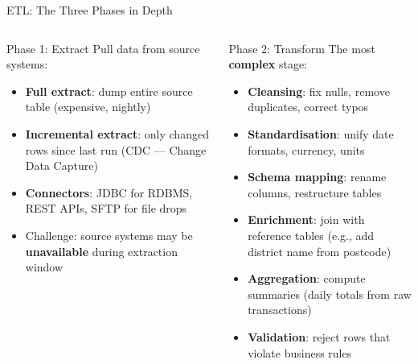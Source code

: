 \documentclass[aspectratio=169,10pt]{beamer}
\begin{document}
\begin{frame}{ETL: The Three Phases in Depth}
  \begin{columns}[T]
      \begin{block}{Phase 1: Extract}
        \vspace{2pt}
        Pull data from source systems:
        \begin{itemize}
          \small
          \item \textbf{Full extract}: dump entire source table (expensive, nightly)
          \item \textbf{Incremental extract}: only changed rows since last run (CDC — Change Data Capture)
          \item \textbf{Connectors}: JDBC for RDBMS, REST APIs, SFTP for file drops
          \item Challenge: source systems may be \textbf{unavailable} during extraction window
        \end{itemize}
      \end{block}

      \begin{exampleblock}{Phase 2: Transform}
        \vspace{2pt}
        The most \textbf{complex} stage:
        \begin{itemize}
          \small
          \item \textbf{Cleansing}: fix nulls, remove duplicates, correct typos
          \item \textbf{Standardisation}: unify date formats, currency, units
          \item \textbf{Schema mapping}: rename columns, restructure tables
          \item \textbf{Enrichment}: join with reference tables (e.g., add district name from postcode)
          \item \textbf{Aggregation}: compute summaries (daily totals from raw transactions)
          \item \textbf{Validation}: reject rows that violate business rules
        \end{itemize}
      \end{exampleblock}


\end{columns}
\end{frame}
\end{document}
